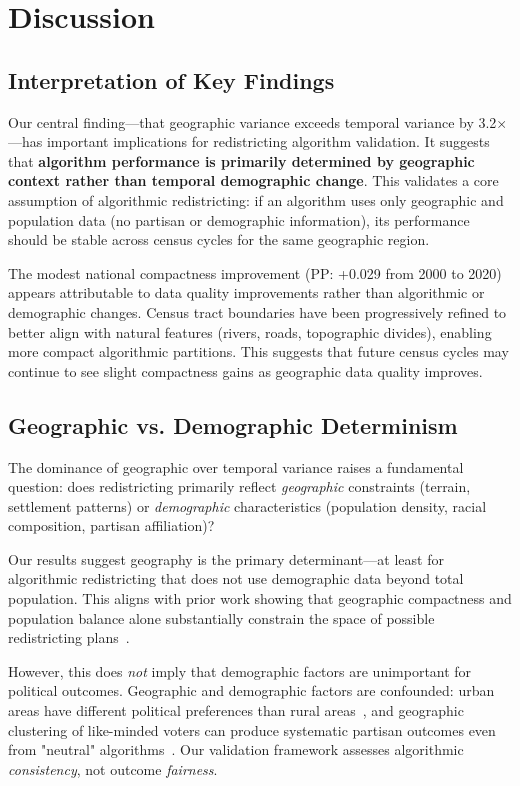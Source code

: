 \section{Discussion}
\label{sec:discussion}

\subsection{Interpretation of Key Findings}

Our central finding—that geographic variance exceeds temporal variance by 3.2×—has important implications for redistricting algorithm validation. It suggests that \textbf{algorithm performance is primarily determined by geographic context rather than temporal demographic change}. This validates a core assumption of algorithmic redistricting: if an algorithm uses only geographic and population data (no partisan or demographic information), its performance should be stable across census cycles for the same geographic region.

The modest national compactness improvement (PP: +0.029 from 2000 to 2020) appears attributable to data quality improvements rather than algorithmic or demographic changes. Census tract boundaries have been progressively refined to better align with natural features (rivers, roads, topographic divides), enabling more compact algorithmic partitions. This suggests that future census cycles may continue to see slight compactness gains as geographic data quality improves.

\subsection{Geographic vs. Demographic Determinism}

The dominance of geographic over temporal variance raises a fundamental question: does redistricting primarily reflect \textit{geographic} constraints (terrain, settlement patterns) or \textit{demographic} characteristics (population density, racial composition, partisan affiliation)?

Our results suggest geography is the primary determinant—at least for algorithmic redistricting that does not use demographic data beyond total population. This aligns with prior work showing that geographic compactness and population balance alone substantially constrain the space of possible redistricting plans~\cite{deford2021}.

However, this does \textit{not} imply that demographic factors are unimportant for political outcomes. Geographic and demographic factors are confounded: urban areas have different political preferences than rural areas~\cite{rodden2019}, and geographic clustering of like-minded voters can produce systematic partisan outcomes even from "neutral" algorithms~\cite{chen2013}. Our validation framework assesses algorithmic \textit{consistency}, not outcome \textit{fairness}.

